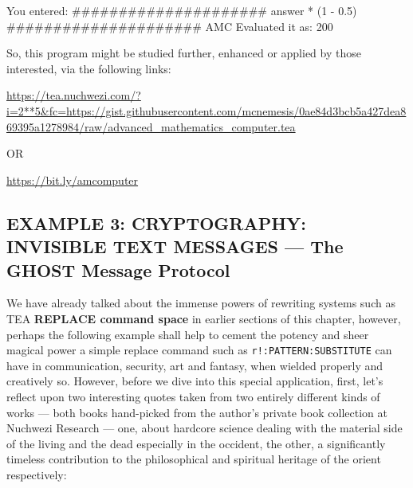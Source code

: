 \documentclass[a4paper, 18pt]{book} %
\begin{document}
{{{\vspace{2em}


     \begin{tcbverbatim}[title=Sample OUTPUT 7 from AMC v3.1]
You entered:
#####################
answer * (1 - 0.5)
#####################
AMC Evaluated it as: 200
  \end{tcbverbatim}

\vspace{1em}


So, this program might be studied further, enhanced or applied by those interested, via the following links:


 \vspace{1em}

 \url{https://tea.nuchwezi.com/?i=2**5&fc=https://gist.githubusercontent.com/mcnemesis/0ae84d3bcb5a427dea869395a1278984/raw/advanced_mathematics_computer.tea}

\vspace{1em} 

OR

\vspace{1em} 

 \url{https://bit.ly/amcomputer}



\subsection{EXAMPLE 3: \textbf{CRYPTOGRAPHY:} INVISIBLE TEXT MESSAGES --- The GHOST Message Protocol }
\label{SECEXAMP3R}


We have already talked about the immense powers of rewriting systems such as TEA \textbf{REPLACE command space} in earlier sections of this chapter, however, perhaps the following example shall help to cement the potency and sheer magical power a simple replace command such as \texttt{r!:PATTERN:SUBSTITUTE} can have in communication, security, art and fantasy, when wielded properly and creatively so. However, before we dive into this special application, first, let's reflect upon two interesting quotes taken from two entirely different kinds of works --- both books hand-picked from the author's private book collection at Nuchwezi Research --- one, about hardcore science dealing with the material side of the living and the dead especially in the occident, the other, a significantly timeless contribution to the philosophical and spiritual heritage of the orient respectively:


\vspace{2em}

}}}
\end{document}
